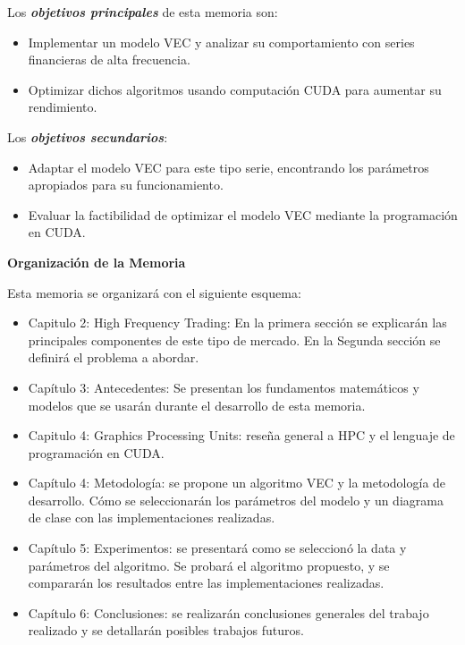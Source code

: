 Los \emph{\textbf{objetivos principales}} de esta memoria son:
\begin{itemize}
	\item Implementar un modelo VEC y analizar su comportamiento con
series financieras de alta frecuencia.
	\item Optimizar dichos algoritmos usando computación CUDA para aumentar su rendimiento.
\end{itemize} 

Los \emph{\textbf{objetivos secundarios}}:
\begin{itemize}
	\item Adaptar el modelo VEC para este tipo serie, encontrando
los parámetros apropiados para su funcionamiento.
	\item Evaluar la factibilidad de optimizar el modelo VEC mediante la
programación en CUDA.
\end{itemize}


\textbf{Organización de la Memoria}

Esta memoria se organizará con el siguiente esquema:
\begin{itemize}
 \item Capitulo 2: High Frequency Trading: En la primera sección se
explicarán las principales componentes de este tipo de mercado. En la
Segunda sección se definirá el problema a abordar.
 \item Capítulo 3: Antecedentes: Se presentan los fundamentos matemáticos y
modelos que se usarán durante el desarrollo de esta memoria.
 \item Capitulo 4: Graphics Processing Units: reseña general a HPC y el 
lenguaje de programación en CUDA.
 \item Capítulo 4: Metodología: se propone un algoritmo VEC y la metodología de
desarrollo. Cómo se seleccionarán los parámetros del modelo y un diagrama de
clase con las implementaciones realizadas.
 \item Capítulo 5: Experimentos: se presentará como se seleccionó la data y
parámetros del algoritmo. Se probará el algoritmo propuesto, y se compararán
los resultados entre las implementaciones realizadas.
 \item Capítulo 6: Conclusiones: se realizarán conclusiones generales del
trabajo realizado y se detallarán posibles trabajos futuros.
\end{itemize}
